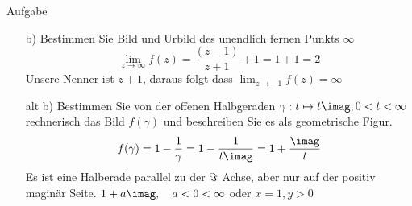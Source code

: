 \documentclass{scrartcl}
\begin{document}
\begin{section}{Aufgabe}
\begin{itemize}
\item[b)] Bestimmen Sie Bild und Urbild des unendlich fernen Punkts $\infty$
\[\lim_{z\rightarrow\infty}f(z)=\frac{(z-1)}{z+1}+1=1+1=2\]
Unsere Nenner ist $z+1$, daraus folgt dass $\lim_{z\rightarrow-1} f(z)=\infty$

\item[alt b)]
Bestimmen Sie von der offenen Halbgeraden $\gamma : t \mapsto t \imag, 0 < t < \infty$ rechnerisch
das Bild $f(\gamma)$ und beschreiben Sie es als geometrische Figur.
\[f(\gamma)=1-\frac{1}{\gamma}=1-\frac{1}{t \imag}=1+\frac{\imag}{t}\]
Es ist eine Halberade parallel zu der $\imaginary$ Achse, aber nur auf der positiv maginär Seite. $1+a \imag,\quad a<0<\infty$
oder $x=1,y>0$



\end{itemize}
\end{section}
\end{document}
